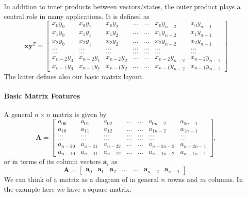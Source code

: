 In addition to inner products between vectors/states, the outer
product plays a central role in many applications. It is
defined as
\[
\bm{x}\bm{y}^T = \begin{bmatrix}
               x_0y_0 & x_0y_1 & x_0y_2 & \dots & \dots & x_0y_{n-2} & x_0y_{n-1} \\
	       x_1y_0 & x_1y_1 & x_1y_2 & \dots & \dots & x_1y_{n-2} & x_1y_{n-1} \\
	       x_2y_0 & x_2y_1 & x_2y_2 & \dots & \dots & x_2y_{n-2} & x_2y_{n-1} \\	       
               \dots &   \dots   & \dots  & \dots & \dots & \dots & \dots \\
               \dots &   \dots   & \dots  & \dots & \dots & \dots & \dots \\	       
	       x_{n-2}y_0 & x_{n-2}y_1 & x_{n-2}y_2 & \dots & \dots & x_{n-2}y_{n-2} & x_{n-2}y_{n-1} \\
	       x_{n-1}y_0 & x_{n-1}y_1 & x_{n-1}y_2 & \dots & \dots & x_{n-1}y_{n-2} & x_{n-1}y_{n-1} \end{bmatrix}	       
\]
The latter defines also our basic matrix layout.


\paragraph{Basic Matrix Features}

A general $n\times n$ matrix is given by 
\[
 \bm{A} =
\begin{bmatrix}
               a_{00} & a_{01} & a_{02} & \dots & \dots & a_{0n-2} & a_{0n-1} \\
               a_{10} & a_{11} & a_{12} & \dots & \dots & a_{1n-2} & a_{1n-1} \\
               \dots &   \dots   & \dots  & \dots & \dots & \dots & \dots \\
               \dots &   \dots   & \dots  & \dots & \dots & \dots & \dots \\	       
               a_{n-20} & a_{n-21} & a_{n-22} & \dots & \dots & a_{n-2n-2} & a_{n-2n-1} \\
               a_{n-10} & a_{n-11} & a_{n-12} & \dots & \dots & a_{n-1n-2} & a_{n-1n-1} \end{bmatrix},	       
\]
or in terms of its column vectors $\bm{a}_i$ as
\[
 \bm{A} =
\begin{bmatrix}\bm{a}_{0} & \bm{a}_{1} & \bm{a}_{2} & \dots & \dots & \bm{a}_{n-2} & \bm{a}_{n-1}\end{bmatrix}.	       
\]
We can think of a matrix as a diagram of in general $n$ rowns and $m$ columns. In the example here we have a square matrix.


